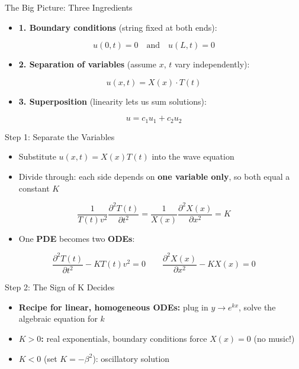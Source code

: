 \documentclass[
  ignorenonframetext,
  aspectratio=169,
  handout]{beamer}
\providecommand{\tightlist}{%
  \setlength{\itemsep}{0pt}\setlength{\parskip}{0pt}}
\begin{document}
\begin{frame}
\begin{block}{The Big Picture: Three Ingredients}
\protect{}\label{the-big-picture-three-ingredients}
\begin{itemize}
\tightlist
\item
  \textbf{1. Boundary conditions} (string fixed at both ends):
\end{itemize}

\[u(0, t) = 0 \quad \text{and} \quad u(L, t) = 0\]

\begin{itemize}
\tightlist
\item
  \textbf{2. Separation of variables} (assume \(x\), \(t\) vary
  independently):
\end{itemize}

\[u(x, t) = X(x) \cdot T(t)\]

\begin{itemize}
\tightlist
\item
  \textbf{3. Superposition} (linearity lets us sum solutions):
\end{itemize}

\[u = c_1 u_1+c_2u_2\]
\end{block}

\begin{block}{Step 1: Separate the Variables}
\protect{}\label{step-1-separate-the-variables}
\begin{itemize}
\tightlist
\item
  Substitute \(u(x,t) = X(x)T(t)\) into the wave equation
\item
  Divide through: each side depends on \textbf{one variable only}, so
  both equal a constant \(K\)
\end{itemize}

\[\frac{1}{T(t)v^2}\frac{\partial^2 T(t)}{\partial t^2} = \frac{1}{X(x)}\frac{\partial^2 X(x)}{\partial x^2} = K\]

\begin{itemize}
\tightlist
\item
  One \textbf{PDE} becomes two \textbf{ODEs}:
\end{itemize}

\[\frac{\partial^2 T(t)}{\partial t^2} - K T(t) v^2 = 0 \qquad \frac{\partial^2 X(x)}{\partial x^2} - K X(x) = 0\]
\end{block}

\begin{block}{Step 2: The Sign of K Decides}
\protect{}\label{step-2-the-sign-of-k-decides}
\begin{itemize}
\tightlist
\item
  \textbf{Recipe for linear, homogeneous ODEs:} plug in
  \(y \to e^{kx}\), solve the algebraic equation for \(k\)
\item
  \textbf{\(K > 0\):} real exponentials, boundary conditions force
  \(X(x) = 0\) (no music!)
\item
  \textbf{\(K < 0\)} (set \(K = -\beta^2\)): oscillatory solution
\end{itemize}


\end{block}
\end{frame}
\end{document}
